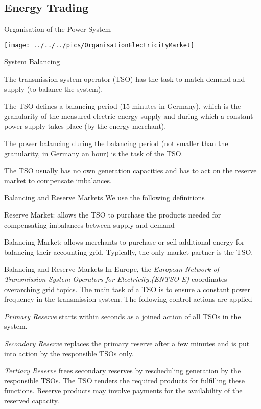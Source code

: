 
\subsection{Energy Trading}

{Organisation of the Power System}
\begin{center}
\texttt{[image: ../../../pics/OrganisationElectricityMarket]}
\end{center}

{System Balancing}
\item<1-> The transmission system operator (TSO) has the task to match demand and supply (to balance the system).
\item<2-> The TSO defines a balancing period (15 minutes in Germany), which is the granularity of the measured electric energy supply and during which a constant power supply takes place (by the energy merchant).
\item<3->  The power balancing during the balancing period (not smaller than the granularity, in Germany an hour) is the task of the TSO.
\item<4-> The TSO usually has no own generation capacities and has to act on the reserve market to compensate imbalances.

{Balancing and Reserve Markets}
We use the following definitions
\item<1-> Reserve Market: allows the TSO to purchase the products needed for compensating imbalances between supply and demand
\item<2->  Balancing Market: allows merchants to purchase or sell additional energy for balancing their accounting grid. Typically, the only market partner is the TSO.

{Balancing and Reserve Markets}
In Europe, the {\it European Network of Transmission System Operators for Electricity,(ENTSO-E)} coordinates overarching grid topics. The main task of a TSO is to ensure a constant power frequency in the transmission system. The following control actions are applied
\item<1->{\it Primary Reserve}   starts within seconds as a joined action of all TSOs in the system.
\item<2-> {\it Secondary Reserve} replaces the primary reserve after a few minutes and is put into action by the responsible TSOs only.
\item<3->{\it Tertiary Reserve} frees secondary reserves by rescheduling generation by the responsible TSOs.
The TSO tenders the required products for fulfilling these functions. Reserve products may involve payments for the availability of the reserved capacity.

